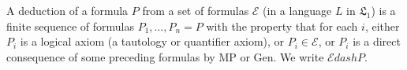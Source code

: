 A deduction of a formula $P$ from a set of formulas $\mathcal{E}$ (in a language $L$ in $\mathfrak{L}_1$) is a finite sequence of formulas $P_1, \ldots, P_n = P$ with the property that for each $i$, either $P_i$ is a logical axiom (a tautology or quantifier axiom), or $P_i \in \mathcal{E}$, or $P_i$ is a direct consequence of some preceding formulas by MP or Gen. We write $\mathcal{E} dash P$.

